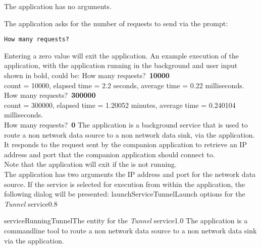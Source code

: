 The application has no arguments.
\insertShortClientParameters{}

The application asks for the number of requests to send via the prompt:
\outputBegin
\begin{verbatim}
How many requests?
\end{verbatim}
\outputEnd{}
Entering a zero value will exit the application.
An example execution of the application, with the 
application running in the background and user input shown in bold, could be:
\outputBegin{}
How many requests?\ \textbf{10000}\\
count = 10000, elapsed time = 2.2 seconds, average time = 0.22 milliseconds.\\
How many requests?\ \textbf{300000}\\
count = 300000, elapsed time = 1.20052 minutes, average time = 0.240104 milliseconds.\\
How many requests?\ \textbf{0}
\outputEnd
{}
\condPage
{}
The  application is a background service that is used to
route a non\longDash\yarp{} network data source to a non\longDash\yarp{} network data
sink, via the  application.\\

It responds to the  request sent by the
companion application  to retrieve an IP address and port
that the companion application should connect to.\\

Note that the application will exit if the  is not
running.\\

The application has two arguments \longDash{} the IP address and port for the network data
source.
\insertAutoAppParameters
{}
\condPage
If the service is selected for execution from within the \emph{\MMMU} application, the
following dialog will be presented:
%
{launchServiceTunnel}{Launch options for the \emph{Tunnel} service}{0.8}

%
{serviceRunningTunnel}{The \emph{\MMMU} entity for the \emph{Tunnel} service}{1.0}
\condPage
{}
The  application is a command\longDash{}line tool to route a
non\longDash\yarp{} network data source to a non\longDash\yarp{} network data sink via
the  application.\\

